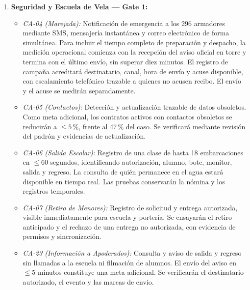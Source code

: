 \begin{enumerate}
\begin{itemize}
        \item \emph{CA-13 (Legajo de Zarpe):} Conformación de nómina y antecedentes en $\le 90$ segundos, con comprobación de vigencia documental. El informe conservará el legajo y los tiempos. Como meta adicional, las correcciones manuales se reducirán a $\le 5\,\%$, respecto del 34\,\% registrado en el caso.
    \end{itemize}

    \item \textbf{Seguridad y Escuela de Vela --- Gate 1:}
    \begin{itemize}
        \item \emph{CA-04 (Marejada):} Notificación de emergencia a los 296 armadores mediante SMS, mensajería instantánea y correo electrónico de forma simultánea. Para incluir el tiempo completo de preparación y despacho, la medición operacional comienza con la recepción del aviso oficial en torre y termina con el último envío, sin superar diez minutos. El registro de campaña acreditará destinatario, canal, hora de envío y acuse disponible, con escalamiento telefónico trazable a quienes no acusen recibo. El envío y el acuse se medirán separadamente.

        \item \emph{CA-05 (Contactos):} Detección y actualización trazable de datos obsoletos. Como meta adicional, los contratos activos con contactos obsoletos se reducirán a $\le 5\,\%$, frente al 47\,\% del caso. Se verificará mediante revisión del padrón y evidencias de actualización.

        \item \emph{CA-06 (Salida Escolar):} Registro de una clase de hasta 18 embarcaciones en $\le 60$ segundos, identificando autorización, alumno, bote, monitor, salida y regreso. La consulta de quién permanece en el agua estará disponible en tiempo real. Las pruebas conservarán la nómina y los registros temporales.

        \item \emph{CA-07 (Retiro de Menores):} Registro de solicitud y entrega autorizada, visible inmediatamente para escuela y portería. Se ensayarán el retiro anticipado y el rechazo de una entrega no autorizada, con evidencia de permisos y sincronización.

        \item \emph{CA-23 (Información a Apoderados):} Consulta y aviso de salida y regreso sin llamadas a la escuela ni filmación de alumnos. El envío del aviso en $\le 5$ minutos constituye una meta adicional. Se verificarán el destinatario autorizado, el evento y las marcas de envío.
    \end{itemize}


\end{enumerate}
